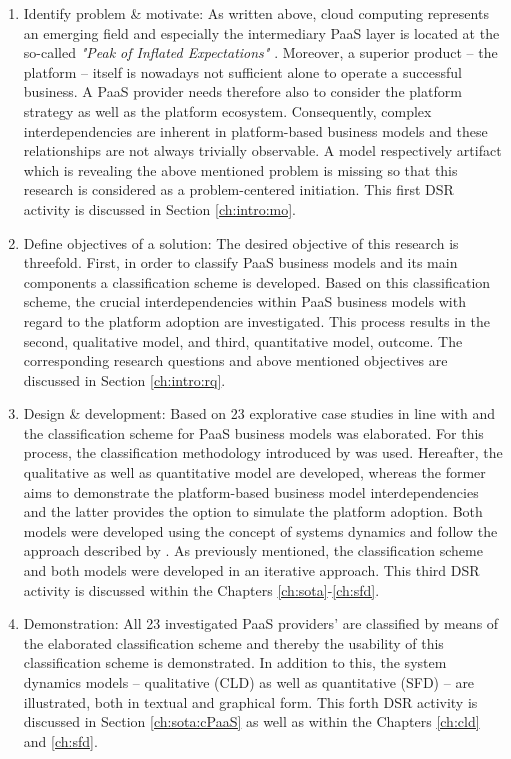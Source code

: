 \begin{enumerate}
	\item Identify problem \& motivate: As written above, cloud computing represents an emerging field and especially the intermediary \ac{PaaS} layer is located at the so-called \textit{"Peak of Inflated Expectations"} \citep[p. 5]{Smith2012}. Moreover, a superior product -- the platform -- itself is nowadays not sufficient alone to operate a successful business. A \ac{PaaS} provider needs therefore also to consider the platform strategy as well as the platform ecosystem. Consequently, complex interdependencies are inherent in platform-based business models and these relationships are not always trivially observable. A model respectively artifact which is revealing the above mentioned problem is missing so that this research is considered as a problem-centered initiation. This first \ac{DSR} activity is discussed in Section \ref{ch:intro:mo}.
	\item Define objectives of a solution: The desired objective of this research is threefold. First, in order to classify \ac{PaaS} business models and its main components a classification scheme is developed. Based on this classification scheme, the crucial interdependencies within \ac{PaaS} business models with regard to the platform adoption are investigated. This process results in the second, qualitative model, and third, quantitative model, outcome. The corresponding research questions and above mentioned objectives are discussed in Section \ref{ch:intro:rq}.
	\item Design \& development: Based on 23 explorative case studies in line with \citet{Eisenhardt1989} and \citet{Yin2008} the classification scheme for \ac{PaaS} business models was elaborated. For this process, the classification methodology introduced by \citet{Fettke2003} was used. Hereafter, the qualitative as well as quantitative model are developed, whereas the former aims to demonstrate the platform-based business model interdependencies and the latter provides the option to simulate the platform adoption. Both models were developed using the concept of systems dynamics and follow the approach described by \citet{Sterman2000,Sterman2001}. As previously mentioned, the classification scheme and both models were developed in an iterative approach. This third \ac{DSR} activity is discussed within the Chapters \ref{ch:sota}-\ref{ch:sfd}.
	\item Demonstration: All 23 investigated \ac{PaaS} providers' are classified by means of the elaborated classification scheme and thereby the usability of this classification scheme is demonstrated. In addition to this, the system dynamics models -- qualitative (\ac{CLD}) as well as quantitative (\ac{SFD}) -- are illustrated, both in textual and graphical form. This forth \ac{DSR} activity is discussed in Section \ref{ch:sota:cPaaS} as well as within the Chapters \ref{ch:cld} and \ref{ch:sfd}.

\end{enumerate}
